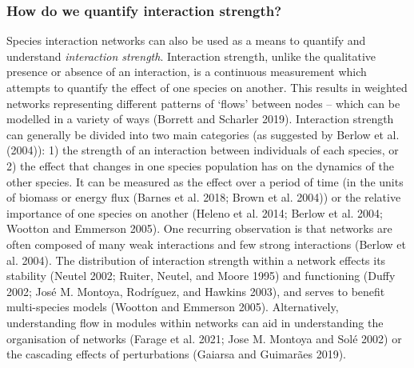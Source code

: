\documentclass[11pt]{article}
\begin{document}
\hypertarget{how-do-we-quantify-interaction-strength}{%
\subsubsection{How do we quantify interaction
strength?}\label{how-do-we-quantify-interaction-strength}}

Species interaction networks can also be used as a means to quantify and
understand \emph{interaction strength}. Interaction strength, unlike the
qualitative presence or absence of an interaction, is a continuous
measurement which attempts to quantify the effect of one species on
another. This results in weighted networks representing different
patterns of `flows' between nodes -- which can be modelled in a variety
of ways (Borrett and Scharler 2019). Interaction strength can generally
be divided into two main categories (as suggested by Berlow et al.
(2004)): 1) the strength of an interaction between individuals of each
species, or 2) the effect that changes in one species population has on
the dynamics of the other species. It can be measured as the effect over
a period of time (in the units of biomass or energy flux (Barnes et al.
2018; Brown et al. 2004)) or the relative importance of one species on
another (Heleno et al. 2014; Berlow et al. 2004; Wootton and Emmerson
2005). One recurring observation is that networks are often composed of
many weak interactions and few strong interactions (Berlow et al. 2004).
The distribution of interaction strength within a network effects its
stability (Neutel 2002; Ruiter, Neutel, and Moore 1995) and functioning
(Duffy 2002; José M. Montoya, Rodríguez, and Hawkins 2003), and serves
to benefit multi-species models (Wootton and Emmerson 2005).
Alternatively, understanding flow in modules within networks can aid in
understanding the organisation of networks (Farage et al. 2021; Jose M.
Montoya and Solé 2002) or the cascading effects of perturbations
(Gaiarsa and Guimarães 2019).
\end{document}
